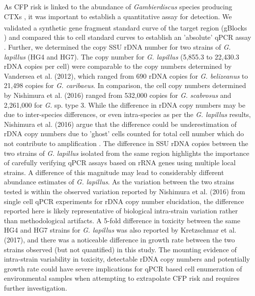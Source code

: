 \documentclass[12pt]{article}
\begin{document}
As CFP risk is linked to the abundance of \emph{Gambierdiscus} species producing CTXs \cite{globalcig,berdalet2012global}, it was important to establish a quantitative assay for detection.
We validated a synthetic gene fragment standard curve of the target region (gBlocks \textsuperscript{\textregistered}) and compared this to cell standard curves to establish an 'absolute' qPCR assay \citep{nishimura2016quantitative,hariganeya2013quantitative}. 
Further, we determined the copy SSU rDNA number for two strains of \emph{G. lapillus} (HG4 and HG7). %
The copy number for \emph{G. lapillus} (5,855.3 to 22,430.3 rDNA copies per cell) %
were comparable to the copy numbers determined by Vandersea et al. (2012), which ranged from 690 rDNA copies for \emph{G. belizeanus} to 21,498 copies for \emph{G. caribaeus}. 
In comparison, the cell copy numbers determined by Nishimura et al. (2016) ranged from 532,000 copies for \emph{G. scabrosus} and 2,261,000 for \emph{G.} sp. type 3. While the difference in rDNA copy numbers may be due to inter-species differences, or even intra-species as per the \emph{G. lapillus} results, Nishimura et al. (2016) argue that the difference could be underestimation of rDNA copy numbers due to 'ghost' cells counted for total cell number which do not contribute to amplification \citep{nishimura2016quantitative,hariganeya2013quantitative}.
The difference in SSU rDNA copies between the two strains of \emph{G. lapillus} isolated from the same region highlights the importance of carefully verifying qPCR assays based on rRNA genes using multiple local strains.  
A difference of this magnitude may lead to considerably different abundance estimates of \textit{G. lapillus}. 
As the variation between the two strains tested is within the observed variation reported by Nishimura et al. (2016) from single cell qPCR experiments for rDNA copy number elucidation, the difference reported here is likely representative of biological intra-strain variation rather than methodological artifacts. 
A 5-fold difference in toxicity between the same HG4 and HG7 strains for \emph{G. lapillus} was also reported by Kretzschmar et al. (2017), and there was a noticeable difference in growth rate between the two strains observed (but not quantified) in this study. 
The mounting evidence of intra-strain variability in toxicity, detectable rDNA copy numbers and potentially growth rate could have severe implications for qPCR based cell enumeration of environmental samples when attempting to extrapolate CFP risk and requires further investigation.\\
\end{document}
